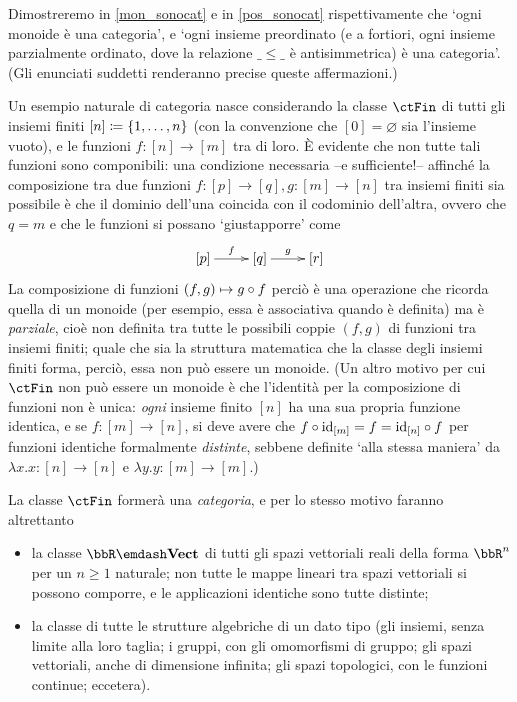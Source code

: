 Dimostreremo in \autoref{mon_sonocat} e in \autoref{pos_sonocat} rispettivamente che `ogni monoide è una categoria', e `ogni insieme preordinato (e a fortiori, ogni insieme parzialmente ordinato, dove la relazione \(\_\le\_\) è antisimmetrica) è una categoria'. (Gli enunciati suddetti renderanno precise queste affermazioni.)
\begin{example}
	Un esempio naturale di categoria nasce considerando la classe \(\ctFin\) di tutti gli insiemi finiti \([n]\coloneqq \{1,\dots,n\}\) (con la convenzione che \([0]=\varnothing\) sia l'insieme vuoto), e le funzioni \(f : [n] \to [m]\) tra di loro. \`E evidente che non tutte tali funzioni sono componibili: una condizione necessaria --e sufficiente!-- affinché la composizione tra due funzioni \(f : [p] \to [q],g : [m] \to [n]\) tra insiemi finiti sia possibile è che il dominio dell'una coincida con il codominio dell'altra, ovvero che \(q=m\) e che le funzioni si possano `giustapporre' come
	\[\xymatrix{
			[p] \ar[r]^-f & [q] \ar[r]^-g & [r]
		}\]
	La composizione di funzioni \((f,g)\mapsto g\circ f\) perciò è una operazione che ricorda quella di un monoide (per esempio, essa è associativa quando è definita) ma è \emph{parziale}, cioè non definita tra tutte le possibili coppie \((f,g)\) di funzioni tra insiemi finiti; quale che sia la struttura matematica che la classe degli insiemi finiti forma, perciò, essa non può essere un monoide. (Un altro motivo per cui \(\ctFin\) non può essere un monoide è che l'identità per la composizione di funzioni non è unica: \emph{ogni} insieme finito \([n]\) ha una sua propria funzione identica, e se \(f : [m]\to [n]\), si deve avere che \(f\circ \mathrm{id}_{[m]}=f=\mathrm{id}_{[n]}\circ f\) per funzioni identiche formalmente \emph{distinte}, sebbene definite `alla stessa maniera' da \(\lambda x.x : [n]\to [n]\) e \(\lambda y.y : [m]\to [m]\).)

	La classe \(\ctFin\) formerà una \emph{categoria}, e per lo stesso motivo faranno altrettanto
	\begin{itemize}
		\item {} la classe \(\bbR\emdash\ctVect\) di tutti gli spazi vettoriali reali della forma \(\bbR^n\) per un \(n\ge 1\) naturale; non tutte le mappe lineari tra spazi vettoriali si possono comporre, e le applicazioni identiche sono tutte distinte;
		\item la classe di tutte le strutture algebriche di un dato tipo (gli insiemi, senza limite alla loro taglia; i gruppi, con gli omomorfismi di gruppo; gli spazi vettoriali, anche di dimensione infinita; gli spazi topologici, con le funzioni continue; eccetera).
	\end{itemize}
\end{example}
